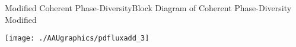 \documentclass[10pt]{beamer}
\begin{document}
\begin{frame}{Modified Coherent Phase-Diversity}{Block Diagram of Coherent Phase-Diversity Modified}
\addtocounter{framenumber}{-1}
\hspace*{40pt}
\texttt{[image: ./AAUgraphics/pdfluxadd\_3]}
\end{frame}

%

\end{document}
